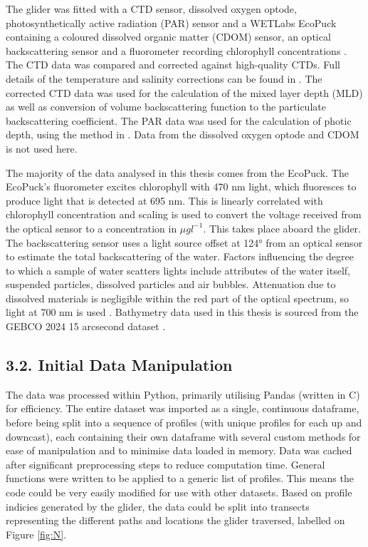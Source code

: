\documentclass[
	a4paper, %
	10pt, %
	unnumberedsections, %
	twoside, %
]{LTJournalArticle}
\begin{document}
\begin{multicols}{2}
The glider was fitted with a CTD sensor, dissolved oxygen optode, photosynthetically active radiation (PAR) sensor and a WETLabs
EcoPuck containing a coloured dissolved organic matter (CDOM) sensor, an optical backscattering sensor and a fluorometer recording
chlorophyll concentrations \citep{ref1}. The CTD data was compared and corrected against high-quality CTDs. Full details of the
temperature and salinity corrections can be found in \citet{ref2}. The corrected CTD data was used for the calculation of the
mixed layer depth (MLD) as well as conversion of volume backscattering function to the particulate backscattering coefficient. The
PAR data was used for the calculation of photic depth, using the method in \citet{ref42}. Data from the dissolved oxygen optode
and CDOM is not used here.


The majority of the data analysed in this thesis comes from the EcoPuck. The EcoPuck’s fluorometer excites chlorophyll with 470
nm light, which fluoresces to produce light that is detected at 695 nm. This is linearly correlated with chlorophyll concentration
and scaling is used to convert the voltage received from the optical sensor to a concentration in $\mu g l^{-1}$. This takes place
aboard the glider. The backscattering sensor uses a light source offset at 124° from an optical sensor to estimate the total
backscattering of the water. Factors influencing the degree to which a sample of water scatters lights include attributes of the
water itself, suspended particles, dissolved particles and air bubbles. Attenuation due to dissolved materials is negligible within
the red part of the optical spectrum, so light at 700 nm is used \citep{ref3}. Bathymetry data used in this thesis is sourced from
the GEBCO 2024 15 arcsecond dataset \citep{ref7}.


\subsection{3.2. Initial Data Manipulation}
The data was processed within Python, primarily utilising Pandas (written in C) for efficiency. The entire dataset was imported as
a single, continuous dataframe, before being split into a sequence of profiles (with unique profiles for each up and downcast), each
containing their own dataframe with several custom methods for ease of manipulation and to minimise data loaded in memory. Data was
cached after significant preprocessing steps to reduce computation time. General functions were written to be applied to a generic
list of profiles. This means the code could be very easily modified for use with other datasets. Based on profile indicies generated
by the glider, the data could be split into transects representing the different paths and locations the glider traversed, labelled
on Figure \ref{fig:N}. 


\end{multicols}
\end{document}
